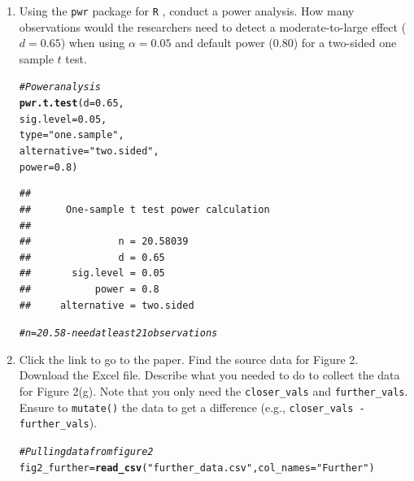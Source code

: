 \documentclass{article}\usepackage[]{graphicx}\usepackage[]{xcolor}
\makeatletter
\newcommand{\hlnum}[1]{\textcolor[rgb]{0.686,0.059,0.569}{#1}}%
\newcommand{\hlsng}[1]{\textcolor[rgb]{0.192,0.494,0.8}{#1}}%
\newcommand{\hlcom}[1]{\textcolor[rgb]{0.678,0.584,0.686}{\textit{#1}}}%
\newcommand{\hldef}[1]{\textcolor[rgb]{0.345,0.345,0.345}{#1}}%
\newcommand{\hlkwb}[1]{\textcolor[rgb]{0.69,0.353,0.396}{#1}}%
\newcommand{\hlkwc}[1]{\textcolor[rgb]{0.333,0.667,0.333}{#1}}%
\newcommand{\hlkwd}[1]{\textcolor[rgb]{0.737,0.353,0.396}{\textbf{#1}}}%
\newenvironment{kframe}{%
 \def\at@end@of@kframe{}%
 \ifinner\ifhmode%
  \def\at@end@of@kframe{\end{minipage}}%
  \begin{minipage}{\columnwidth}%
 \fi\fi%
 \def\FrameCommand##1{\hskip\@totalleftmargin \hskip-\fboxsep
 \colorbox{shadecolor}{##1}\hskip-\fboxsep
     \hskip-\linewidth \hskip-\@totalleftmargin \hskip\columnwidth}%
 \MakeFramed {\advance\hsize-\width
   \@totalleftmargin\z@ \linewidth\hsize
   \@setminipage}}%
 {\par\unskip\endMakeFramed%
 \at@end@of@kframe}
\newenvironment{knitrout}{}{} %
\makeatother
\begin{document}
\begin{enumerate}
\item Using the \texttt{pwr} package for \texttt{R} \citep{pwr},
conduct a power analysis. How many observations would the researchers 
need to detect a moderate-to-large effect ($d=0.65$) when using 
$\alpha=0.05$ and default power (0.80) for a two-sided one sample 
$t$ test.

\begin{knitrout}\scriptsize
{}\color{fgcolor}\begin{kframe}
\begin{alltt}
\hlcom{#Power analysis}
\hlkwd{pwr.t.test}\hldef{(}\hlkwc{d}\hldef{=}\hlnum{0.65}\hldef{,}
           \hlkwc{sig.level}\hldef{=}\hlnum{0.05}\hldef{,}
           \hlkwc{type}\hldef{=}\hlsng{"one.sample"}\hldef{,}
           \hlkwc{alternative} \hldef{=} \hlsng{"two.sided"}\hldef{,}
           \hlkwc{power}\hldef{=}\hlnum{0.8}\hldef{)}
\end{alltt}
\begin{verbatim}
## 
##      One-sample t test power calculation 
## 
##               n = 20.58039
##               d = 0.65
##       sig.level = 0.05
##           power = 0.8
##     alternative = two.sided
\end{verbatim}
\begin{alltt}
\hlcom{#n=20.58 - need at least 21 observations}
\end{alltt}
\end{kframe}
\end{knitrout}
 

\item Click the link to go to the paper. Find the source data for 
Figure 2. Download the Excel file. Describe what you needed to
do to collect the data for Figure 2(g). Note that you only need the 
\texttt{closer\_vals} and \texttt{further\_vals}. Ensure to 
\texttt{mutate()} the data to get a difference 
(e.g., \texttt{closer\_vals - further\_vals}).

\begin{knitrout}\scriptsize
{}\color{fgcolor}\begin{kframe}
\begin{alltt}
\hlcom{#Pulling data from figure 2}
\hldef{fig2_further} \hlkwb{=} \hlkwd{read_csv}\hldef{(}\hlsng{"further_data.csv"}\hldef{,} \hlkwc{col_names} \hldef{=} \hlsng{"Further"}\hldef{)}
\end{alltt}



\end{kframe}
\end{knitrout}
\end{enumerate}
\end{document}

